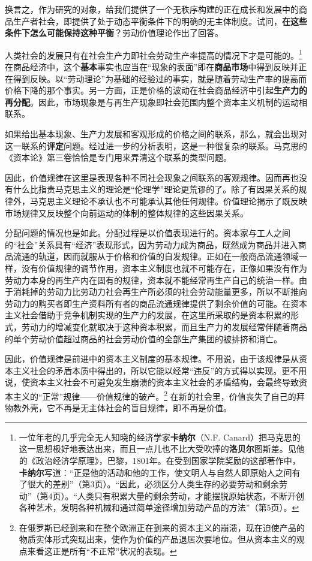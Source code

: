 \documentclass[fontset=fandol, a4paper, 12pt, openright]{ctexbook}
\begin{document}
换言之，作为研究的对象，给我们提供了一个无秩序构建的正在成长和发展中的商品生产者社会，即提供了处于动态平衡条件下的明确的无主体制度。试问，\textbf{在这些条件下怎么可能保持这种平衡}？劳动价值理论作出了回答。

人类社会的发展只有在社会生产力即社会劳动生产率提高的情况下才是可能的。\footnote{一位年老的几乎完全无人知晓的经济学家\textbf{卡纳尔}（N.F. Canard）把马克思的这一思想极好地表达出来，而且一点儿也不比大受吹捧的\textbf{洛贝尔}图斯差。见他的《政治经济学原理》，巴黎，1801年。在受到国家学院奖励的这部著作中，\textbf{卡纳尔}写道：“正是他的活动和他的工作，使文明人与自然人即原始人之间有了很大的差别”（第3页）。“因此，必须区分人类生存的必要劳动和剩余劳动”（第4页）。“人类只有积累大量的剩余劳动，才能摆脱原始状态，不断开创各种艺术，发明各种机械和通过简单途径增加劳动产品的方法”（第5页）。} 在商品经济中，这个\textbf{基本}事实也应当在“现象的表面”即在\textbf{商品市场}中得到反映并正在得到反映。以“劳动理论”为基础的经验过的事实，就是随着劳动生产率的提高而价格下降的那个事实。另一方面，正是价格的波动在社会商品经济中引起\textbf{生产力的再分配}。因此，市场现象是与再生产现象即社会范围内整个资本主义机制的运动相联系。

如果给出基本现象、生产力发展和客观形成的价格之间的联系，那么，就会出现对这一联系的\textbf{评定}问题。经过进一步的分析表明，这是一种很复杂的联系。马克思的《资本论》第三卷恰恰是专门用来弄清这个联系的类型问题。

因此，价值规律在这里是表现各种不同社会现象之间联系的客观规律。因而再也没有什么比指责马克思主义的理论是“伦理学”理论更荒谬的了。除了有因果关系的规律外，马克思主义理论不承认也不可能承认其他任何规律。价值理论揭示了既反映市场规律又反映整个向前运动的体制的整体规律的这些因果关系。

分配问题的情况也是如此。分配过程是以价值表现进行的。资本家与工人之间的“社会”关系具有“经济”表现形式，因为劳动力成为商品，既然成为商品并进入商品流通的轨道，因而就服从于价格和价值的自发规律。正如在一般商品流通领域一样，没有价值规律的调节作用，资本主义制度也就不可能存在，正像如果没有作为劳动力本身的再生产内在固有的规律，资本就不能经常再生产自己的统治一样。由于消耗掉的劳动力比劳动力社会再生产所必须的社会劳动能量更多，所以不断推向劳动力的购买者即生产资料所有者的商品流通规律提供了剩余价值的可能。在资本主义社会借助于竞争机制实现的生产力的发展，在这里所采取的是资本积累的形式，劳动力的增减变化就取决于这种资本积累，而且生产力的发展经常伴随着商品的单个劳动价值超过商品的社会劳动价值的全部生产集团的被排挤和消亡。

因此，价值规律是前进中的资本主义制度的基本规律。不用说，由于该规律是从资本主义社会的矛盾本质中得出的，所以它能以经常“违反”的方式得以实现。更不用说，使资本主义社会不可避免发生崩溃的资本主义社会的矛盾结构，会最终导致资本主义的“正常”规律——价值规律的破产。\footnote{在俄罗斯已经到来和在整个欧洲正在到来的资本主义的崩溃，现在迫使产品的物质实体形式突现出来，使作为价值的产品退居次要地位。但从资本主义的观点来看这正是所有“不正常”状况的表现。} 在新的社会里，价值丧失了自己的拜物教外壳，它不再是无主体社会的盲目规律，即不再是价值。
\end{document}
